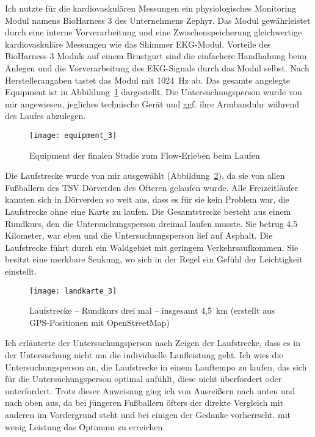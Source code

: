 Ich nutzte für die kardiovaskulären Messungen ein physiologisches Monitoring Modul namens BioHarness 3 des Unternehmens Zephyr. Das Modul gewährleistet durch eine interne Vorverarbeitung und eine Zwischenspeicherung gleichwertige kardiovaskuläre Messungen wie das Shimmer \ac{EKG}-Modul. Vorteile des BioHarness 3 Moduls auf einem Brustgurt sind die einfachere Handhabung beim Anlegen und die Vorverarbeitung des \ac{EKG}-Signals durch das Modul selbst. Nach Herstellerangaben tastet das Modul mit 1024~Hz ab. Das gesamte angelegte Equipment ist in Abbildung~\ref{fig:equipment_3} dargestellt. Die Untersuchungsperson wurde von mir angewiesen, jegliches technische Gerät und ggf. ihre Armbanduhr während des Laufes abzulegen. 
\begin{figure}
	[!htb] \centering 
	\texttt{[image: equipment\_3]} \caption[Equipment (Finale Studie: Laufen)]{Equipment der finalen Studie zum Flow-Erleben beim Laufen} \label{fig:equipment_3} 
\end{figure}

Die Laufstrecke wurde von mir ausgewählt (Abbildung~\ref{fig:landkarte_3}), da sie von allen Fußballern des TSV Dörverden des Öfteren gelaufen wurde. Alle Freizeitläufer kannten sich in Dörverden so weit aus, dass es für sie kein Problem war, die Laufstrecke ohne eine Karte zu laufen. Die Gesamtstrecke besteht aus einem Rundkurs, den die Untersuchungsperson dreimal laufen musste. Sie betrug 4,5 Kilometer, war eben und die Untersuchungsperson lief auf Asphalt. Die Laufstrecke führt durch ein Waldgebiet mit geringem Verkehrsaufkommen. Sie besitzt eine merkbare Senkung, wo sich in der Regel ein Gefühl der Leichtigkeit einstellt. 
\begin{figure}
	[!htb] \centering 
	\texttt{[image: landkarte\_3]} \caption[Laufstrecke -- Rundkurs]{Laufstrecke -- Rundkurs drei mal -- insgesamt 4,5~km (erstellt aus \acs{GPS}-Positionen mit OpenStreetMap)} \label{fig:landkarte_3} 
\end{figure}

Ich erläuterte der Untersuchungsperson nach Zeigen der Laufstrecke, dass es in der Untersuchung nicht um die individuelle Laufleistung geht. Ich wies die Untersuchungsperson an, die Laufstrecke in einem Lauftempo zu laufen, das sich für die Untersuchungsperson optimal anfühlt, diese nicht überfordert oder unterfordert. Trotz dieser Anweisung ging ich von Ausreißern nach unten und nach oben aus, da bei jüngeren Fußballern öfters der direkte Vergleich mit anderen im Vordergrund steht und bei einigen der Gedanke vorherrscht, mit wenig Leistung das Optimum zu erreichen. 

